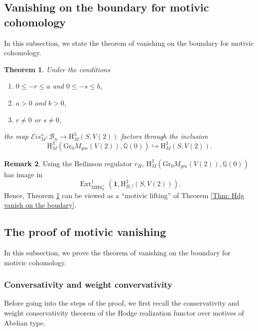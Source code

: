 \documentclass[11pt, a4paper]{amsart}
\theoremstyle{plain}
\newtheorem{theorem}{Theorem}[section]
\theoremstyle{definition}
\newtheorem{remark}[theorem]{Remark}
\numberwithin{equation}{section}
\def\QQ{\mathbb{Q}}
\def\RR{\mathbb{R}}
\DeclareMathOperator{\Ext}{Ext}
\begin{document}
\subsection{Vanishing on the boundary for motivic cohomology}
\label{SS: the proof of the vanishing}
In this subsection, we state the theorem of vanishing on the boundary for motivic cohomology. 

\begin{theorem}
\label{Thm: mot vanish on the boudary}
Under the conditions
\begin{enumerate}
     \item $0 \le -r \le a$ and  $0 \le -s \le b$, 
     \item $a > 0$ and $b > 0$,
     \item $r \neq 0$ or $s \neq 0$, 
\end{enumerate}
the map $\mathcal{E}is_{M}^n \colon \mathcal{B}_{n} \rightarrow \mathrm{H}^{3}_{M}(S, V(2))$ factors through the inclusion 
\[
    \mathrm{H}_{M}^{3}(\mathrm{Gr_{0}}M_{gm}(V(2)), \QQ(0)) \hookrightarrow \mathrm{H}^{3}_{M}(S, V(2)). 
\] 
\end{theorem}

\begin{remark}
    Using the Beilinson regulator $r_{H}$, $\mathrm{H}_{M}^{3}(\mathrm{Gr_{0}}M_{gm}(V(2)), \QQ(0))$ has image in 
    \begin{equation*}
        \Ext^{1}_{\mathrm{MHS}_{\RR}^{+}}(\mathbf{1}, \mathrm{H}^{2}_{B,!}(S, V(2))).
    \end{equation*}
    Hence, Theorem \ref{Thm: mot vanish on the boudary} can be viewed as a ``motivic lifting'' of Theorem \ref{Thm: Hdg vanish on the boudary}. 
\end{remark}
 
\subsection{The proof of motivic vanishing}
\label{Sec: motivic vanishing}
In this subsection, we prove the theorem of vanishing on the boundary for motivic cohomology. 

\subsubsection{Conversativity and weight convervativity} Before going into the steps of the proof, we first recall the conservativity and weight conservativity theorem of the Hodge realization functor over motives of Abelian type. 
\end{document}
